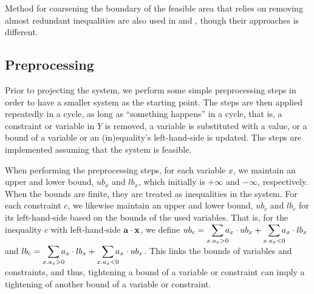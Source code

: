 Method for coarsening the boundary of the feasible area that relies on removing almost redundant inequalities are also used in \cite{lukatskii08} and \cite{shapot12}, though their approaches is different.

\subsection{Preprocessing}
Prior to projecting the system, we perform some simple preprocessing steps in order to have a smaller system as the starting point. The steps are then applied repeatedly in a cycle, as long as ``something happens'' in a cycle, that is, a constraint or variable in $Y$ is removed, a variable is substituted with a value, or a bound of a variable or an (in)equality's left-hand-side is updated. The steps are implemented assuming that the system is feasible.

When performing the preprocessing steps, for each variable $x$, we maintain an upper and lower bound, $ub_x$ and $lb_x$, which initially is $+\infty$ and $-\infty$, respectively. When the bounds are finite, they are treated as inequalities in the system. For each constraint $c$, we likewise maintain an upper and lower bound, $ub_c$ and $lb_c$ for its left-hand-side {based on the bounds of the used variables}. That is, for the inequality $c$ with left-hand-side $\mathbf{a}\cdot\mathbf{x}$, we define $ub_c = \smashoperator[r]{\sum_{x. a_x>0}}a_x\cdot ub_x + \smashoperator[r]{\sum_{x.a_x<0}}a_x\cdot lb_x$ and $lb_c = \smashoperator[r]{\sum_{x. a_x>0}}a_x\cdot lb_x + \smashoperator[r]{\sum_{x.a_x<0}}a_x\cdot ub_x$. 
This links the bounds of variables and constraints, and thus, %
tightening a bound of a variable or constraint can imply a tightening of another bound of a variable or constraint. 

